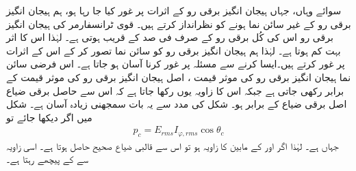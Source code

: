 سوائے وہاں، جہاں  ہیجان انگیز برقی رو کے اثرات پر غور کیا جا رہا ہو، ہم ہیجان انگیز برقی رو کے غیر سائن نما ہونے کو نظرانداز کرتے ہیں۔ قوی ٹرانسفارمر کی  ہیجان انگیز برقی رو اس کی کُل برقی رو کے صرف   فی صد کے قریب ہوتی ہے۔ لہٰذا  اس کا اثر بہت کم ہوتا ہے۔ لہٰذا ہم  ہیجان انگیز برقی رو کو سائن نما تصور کر کے اس کے اثرات پر غور کرتے ہیں۔ایسا کرنے سے مسئلہ پر غور کرنا آسان ہو جاتا ہے۔ اس فرضی سائن نما  ہیجان انگیز برقی رو   کی موثر قیمت  ، اصل  ہیجان انگیز برقی رو کی موثر قیمت کے برابر رکھی جاتی ہے جبکہ اس کا زاویہ  یوں رکھا جاتا ہے کہ اس سے حاصل برقی ضیاع اصل برقی ضیاع کے برابر ہو۔ شکل   کی مدد سے یہ بات سمجھنی زیادہ آسان ہے۔ شکل میں اگر دیکھا جائے تو
\begin{align}
p_c=E_{rms} I_{\varphi,rms} \cos \theta_c
\end{align}
جہاں    ہے۔ لہٰذا  اگر  اور  کے مابین  کا زاویہ ہو تو اس سے قالبی ضیاع صحیح حاصل ہوتا ہے۔ اسی زاویہ  سے    کے پیچھے رہتا ہے۔

